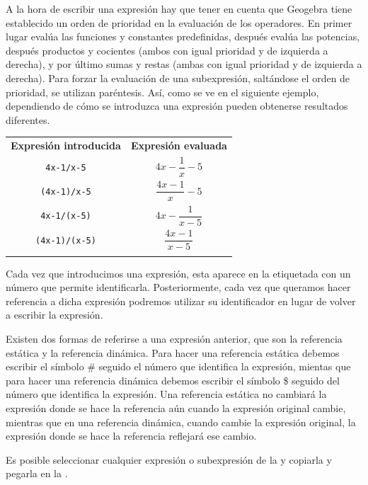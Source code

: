 A la hora de escribir una expresión hay que tener en cuenta que Geogebra tiene establecido un orden de prioridad en la evaluación de los operadores.
En primer lugar evalúa las funciones y constantes predefinidas, después evalúa las potencias, después productos y cocientes (ambos con igual prioridad y de izquierda a derecha), y por último sumas y restas (ambas con igual prioridad y de izquierda a derecha).
Para forzar la evaluación de una subexpresión, saltándose el orden de prioridad, se utilizan paréntesis.
Así, como se ve en el siguiente ejemplo, dependiendo de cómo se introduzca una expresión pueden obtenerse resultados diferentes.


\begin{center}\renewcommand{\arraystretch}{2}
\begin{tabular}{cc}
\tcrule
\textbf{Expresión introducida} & \textbf{Expresión evaluada} \\
\texttt{4x-1/x-5}              & $4x-\dfrac{1}{x}-5$         \\
\texttt{(4x-1)/x-5}            & $\dfrac{4x-1}{x}-5$         \\
\texttt{4x-1/(x-5)}            & $4x-\dfrac{1}{x-5}$         \\
\texttt{(4x-1)/(x-5)}          & $\dfrac{4x-1}{x-5}$         \\
\bcrule
\end{tabular}
\end{center}

Cada vez que introducimos una expresión, esta aparece en la  etiquetada con un número que permite identificarla.
Posteriormente, cada vez que queramos hacer referencia a dicha expresión podremos utilizar su identificador en lugar de volver a escribir la expresión.

Existen dos formas de referirse a una expresión anterior, que son la referencia estática y la referencia dinámica.
Para hacer una referencia estática debemos escribir el símbolo \# seguido el número que identifica la expresión, mientas que para hacer una referencia dinámica debemos escribir el símbolo \$ seguido del número que identifica la expresión.
Una referencia estática no cambiará la expresión donde se hace la referencia aún cuando la expresión original cambie, mientras que en una referencia dinámica, cuando cambie la expresión original, la expresión donde se hace la referencia reflejará ese cambio.

Es posible seleccionar cualquier expresión o subexpresión de la  y copiarla y pegarla en la .


